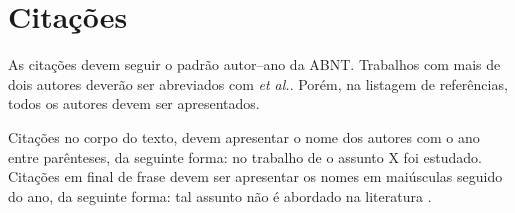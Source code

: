 \section{Citações}

As citações devem seguir o padrão autor--ano da ABNT. Trabalhos com mais de dois
autores deverão ser abreviados com \emph{et al.}.
Porém, na listagem de referências, todos os autores devem ser apresentados.

Citações no corpo do texto, devem apresentar o nome dos autores com o ano entre parênteses,
da seguinte forma: no trabalho de 
o assunto X foi estudado.
Citações em final de frase devem ser apresentar os nomes em maiúsculas seguido do ano,
da seguinte forma: tal assunto não é abordado na literatura \cite{Soares:2003}.
